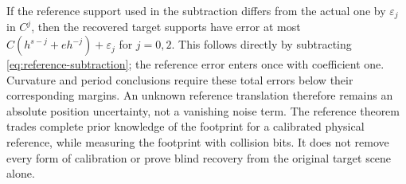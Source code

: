 \begin{remark}
\label{rem:reference-error}
If the reference support used in the subtraction differs from the
actual one by $\varepsilon_j$ in $C^j$, then the recovered target
supports have error at most
$C(h^{s-j}+e h^{-j})+\varepsilon_j$ for $j=0,2$.
This follows directly by subtracting \eqref{eq:reference-subtraction};
the reference error enters once with coefficient one. Curvature and
period conclusions require these total errors below their corresponding
margins. An unknown reference translation therefore remains an absolute
position uncertainty, not a vanishing noise term. The reference theorem
trades complete prior knowledge of the footprint for a calibrated
physical reference, while measuring the footprint with collision bits.
It does not remove every form of calibration or prove blind recovery
from the original target scene alone.
\end{remark}
